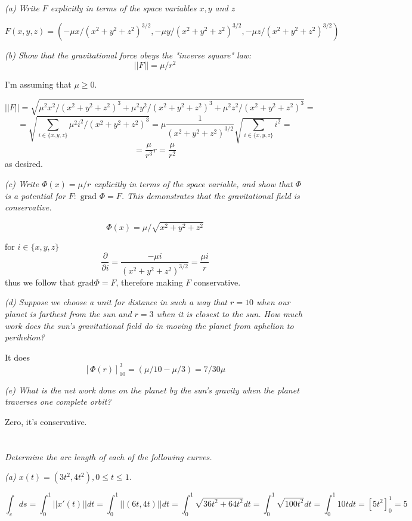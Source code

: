 \documentclass[11pt,oneside,titlepage]{book}
\begin{document}
\textit{(a) Write $F$ explicitly in terms of the space variables $x, y$ and $z$}

$$F(x, y, z) =(- \mu x/(x^2 + y^2 + z^2)^{3/2},
- \mu y/(x^2 + y^2 + z^2)^{3/2}, - \mu z/(x^2 + y^2 + z^2)^{3/2})$$

\textit{(b) Show that the gravitational force obeys the "inverse square" law:
  $$||F|| = \mu/r^2$$}

I'm assuming that $\mu \geq 0$.

$$||F|| = \sqrt{\mu^2 x^2/(x^2 + y^2 + z^2)^{3} + \mu^2 y^2/(x^2 + y^2 + z^2)^{3}  + 
  \mu^2 z^2/(x^2 + y^2 + z^2)^{3}} =  $$
$$
= \sqrt{\sum_{i \in \{x, y, z\}}{\mu^2 i^2/(x^2 + y^2 + z^2)^{3}}} =
\mu \frac{1}{(x^2 + y^2 + z^2)^{3/2}} \sqrt{\sum_{i \in \{x, y, z\}}{ i^2}} = 
$$
$$ =
\frac{\mu}{r^3}  r = \frac{\mu}{r^2}
$$
as desired.

\textit{(c) Write $\Phi(x) = \mu /r$ explicitly in terms of the space variable, and show that $\Phi$
  is a potential for $F: \text{ grad } \Phi = F$. This demonstrates that the gravitational
  field is conservative.}

$$\Phi(x) = \mu / \sqrt{x^2 + y^2 + z^2}$$

for $i \in \{x, y, z\}$
$$\frac{\partial}{\partial i} = \frac{- \mu i}{(x^2 + y^2 + z^2)^{3/2}} = \frac{\mu i}{r}$$
thus we follow that $\text{grad} \Phi = F$, therefore making $F$ conservative.

\textit{(d) Suppose we choose a unit for distance in such a way that $r = 10$ when our
  planet is farthest from the sun and $r = 3$ when it is closest to the sun. How much work
does the sun's gravitational field do in moving the planet from aphelion to perihelion?}

It does
$$\left[\Phi(r)\right]_{10}^3 = (\mu/10 - \mu/3) = 7/30 \mu$$

\textit{(e) What is the net work done on the planet by the sun's gravity when the planet
  traverses one complete orbit? }

Zero, it's conservative.

\section{}

\textit{Determine the arc length of each of the following curves.}

\textit{(a) $x(t) = (3t^2, 4t^2), 0 \leq t \leq 1$.}

$$\int_c{ds} = \int_0^1{||x'(t)|| dt} = \int_0^1{||(6t, 4t)|| dt} =
\int_0^1{\sqrt{36t^2 + 64t^2} dt} = \int_0^1{\sqrt{100t^2} dt} =
\int_0^1{10t dt} = [5t^2]_0^1 = 5$$
\end{document}
